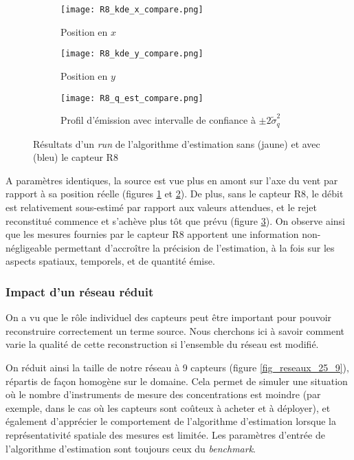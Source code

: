 \begin{figure}[h!]
	\centering
	\begin{subfigure}[t]{0.5\textwidth}
		\centering
		\texttt{[image: R8\_kde\_x\_compare.png]}
		\caption{Position en $x$}
		\label{R8_x}
	\end{subfigure}%
	\begin{subfigure}[t]{0.5\textwidth}
		\centering
		\texttt{[image: R8\_kde\_y\_compare.png]}
		\caption{Position en $y$}
		\label{R8_y}
	\end{subfigure}
	\begin{subfigure}[t]{0.65\textwidth}
		\centering
		\texttt{[image: R8\_q\_est\_compare.png]}
		\caption{Profil d'émission avec intervalle de confiance à  $\pm 2 \tilde{\sigma}_q^2$}
		\label{R8_q}
	\end{subfigure} 
	\caption{Résultats d'un \textit{run} de l'algorithme d'estimation sans (jaune) et avec (bleu) le capteur R8}
	\label{fig_R8_compare}
\end{figure}

A paramètres identiques, la source est vue plus en amont sur l'axe du vent par rapport à sa position réelle (figures \ref{R8_x} et \ref{R8_y}). De plus, sans le capteur R8, le débit est relativement sous-estimé par rapport aux valeurs attendues, et le rejet reconstitué commence et s'achève plus tôt que prévu (figure \ref{R8_q}). On observe ainsi que les mesures fournies par le capteur R8 apportent une information non-négligeable permettant d'accroître la précision de l'estimation, à la fois sur les aspects spatiaux, temporels, et de quantité émise. 

\subsubsection{Impact d'un réseau réduit}

On a vu que le rôle individuel des capteurs peut être important pour pouvoir reconstruire correctement un terme source. Nous cherchons ici à savoir comment varie la qualité de cette reconstruction si l'ensemble du réseau est modifié.

On réduit ainsi la taille de notre réseau à 9 capteurs (figure \ref{fig_reseaux_25_9}), répartis de façon homogène sur le domaine. Cela permet de simuler une situation où le nombre d'instruments de mesure des concentrations est moindre (par exemple, dans le cas où les capteurs sont coûteux à acheter et à déployer), et également d'apprécier le comportement de l'algorithme d'estimation lorsque la représentativité spatiale des mesures est limitée. Les paramètres d'entrée de l'algorithme d'estimation sont toujours ceux du \textit{benchmark}.\\

